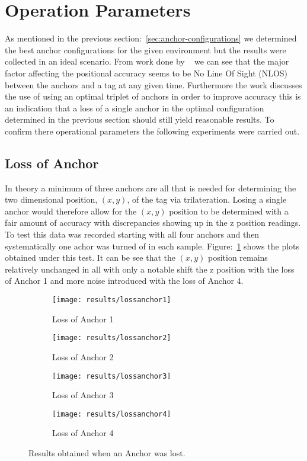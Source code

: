 \section{Operation Parameters}\label{sec:op-params}
As mentioned in the previous section:~\ref{sec:anchor-configurations} we determined the best anchor configurations for the given environment but the results were collected in an ideal scenario.
From work done by ~\citet{evaluwb} we can see that the major factor affecting the positional accuracy seems to be No Line Of Sight (NLOS) between the anchors and a tag at any given time.
Furthermore the work discusses the use of using an optimal triplet of anchors in order to improve accuracy this is an indication that a loss of a single anchor in the optimal configuration determined in the previous section should still yield reasonable results.
To confirm there operational parameters the following experiments were carried out.

\subsection{Loss of Anchor}\label{subsec:loss-of-anchor}
In theory a minimum of three anchors are all that is needed for determining the two dimensional position, $(x,y)$, of the tag via trilateration.
Losing a single anchor would therefore allow for the $(x,y)$ position to be determined with a fair amount of accuracy with discrepancies showing up in the z position readings.
To test this data was recorded starting with all four anchors and then systematically one achor was turned of in each sample.
Figure:~\ref{fig:Loss_anchors} shows the plots obtained under this test.
It can be see that the $(x,y)$ position remains relatively unchanged in all with only a notable shift the z position with the loss of Anchor 1 and more noise introduced with the loss of Anchor 4.

\begin{figure}[h!]
    \centering
    \begin{subfigure}{0.45\textwidth}
            \texttt{[image: results/lossanchor1]}
            \caption{Loss of Anchor 1}
    \end{subfigure}
    \begin{subfigure}{0.45\textwidth}
            \texttt{[image: results/lossanchor2]}
            \caption{Loss of Anchor 2}
    \end{subfigure}

    \begin{subfigure}{0.45\textwidth}
            \texttt{[image: results/lossanchor3]}
            \caption{Loss of Anchor 3}
    \end{subfigure}
    \begin{subfigure}{0.45\textwidth}
            \texttt{[image: results/lossanchor4]}
            \caption{Loss of Anchor 4}
    \end{subfigure}
    \caption{Results obtained when an Anchor was lost.}
    \label{fig:Loss_anchors}
\end{figure}
\newpage
